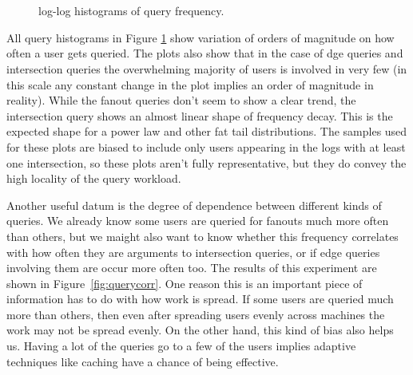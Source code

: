 \begin{figure}
\centering
\renewcommand{\gridscale}{3.5in}
 \\
 \\
\caption{log-log histograms of query frequency.}
\label{fig:queryfreq}
\end{figure}

All query histograms in Figure \ref{fig:queryfreq} show variation of orders of magnitude on how often a user gets queried. The plots also show that in the case of dge queries and intersection queries the overwhelming majority of users is involved in very few (in this scale any constant change in the plot implies an order of magnitude in reality). While the fanout queries don't seem to show a clear trend, the intersection query shows an almost linear shape of frequency decay. This is the expected shape for a power law and other fat tail distributions. The samples used for these plots are biased to include only users appearing in the logs with at least one intersection, so these plots aren't fully representative, but they do convey the high locality of the query workload.

Another useful datum is the degree of dependence between different kinds of queries. We already know some users are queried for fanouts much more often than others, but we maight also want to know whether this frequency correlates with how often they are arguments to intersection queries, or if edge queries involving them are occur more often too. The results of this experiment are shown in Figure~\ref{fig:querycorr}. One reason this is an important piece of information has to do with how work is spread. If some users are queried much more than others, then even after spreading users evenly across machines the work may not be spread evenly. On the other hand, this kind of bias also helps us. Having a lot of the queries go to a few of the users implies adaptive techniques like caching have a chance of being effective.


